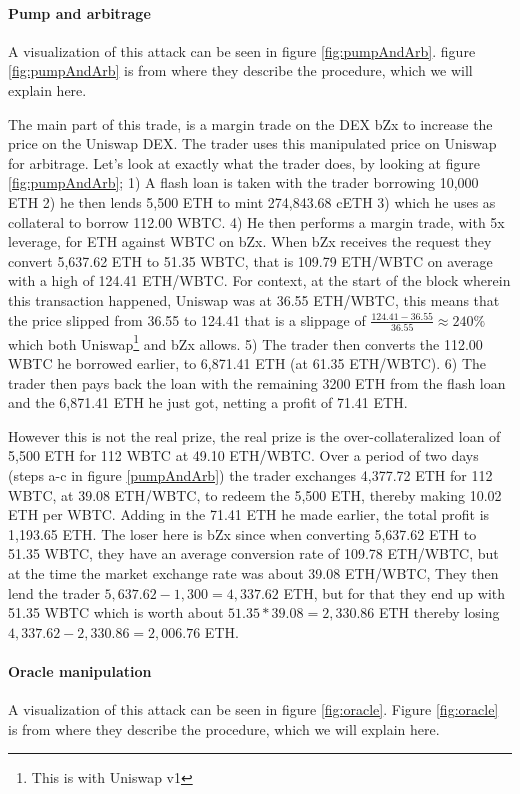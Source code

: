 \paragraph{Pump and arbitrage} A visualization of this attack can be
seen in figure \ref{fig:pumpAndArb}. figure \ref{fig:pumpAndArb} is
from \cite{attack} where they describe the procedure, which we will
explain here.

The main part of this trade, is a margin trade on the DEX bZx to
increase the price on the Uniswap DEX. The trader uses this
manipulated price on Uniswap for arbitrage. Let's look at exactly what
the trader does, by looking at figure \ref{fig:pumpAndArb}; 1) A flash
loan is taken with the trader borrowing 10,000 ETH 2) he then lends
5,500 ETH to mint 274,843.68 cETH 3) which he uses as collateral to
borrow 112.00 WBTC. 4) He then performs a margin trade, with 5x
leverage, for ETH against WBTC on bZx. When bZx receives the request
they convert 5,637.62 ETH to 51.35 WBTC, that is 109.79 ETH/WBTC on
average with a high of 124.41 ETH/WBTC. For context, at the start of
the block wherein this transaction happened, Uniswap was at 36.55 ETH/WBTC,
this means that the price slipped from 36.55 to 124.41 that is a
slippage of $\frac{124.41-36.55}{36.55}\approx 240\%$ which both
Uniswap\footnote{This is with Uniswap v1} and bZx allows. 5) The
trader then converts the 112.00 WBTC he borrowed earlier, to 6,871.41
ETH (at 61.35 ETH/WBTC). 6) The trader then pays back the loan with
the remaining 3200 ETH from the flash loan and the 6,871.41 ETH he
just got, netting a profit of 71.41 ETH.

However this is not the real prize, the real prize is the
over-collateralized loan of 5,500 ETH for 112 WBTC at 49.10 ETH/WBTC.
Over a period of two days (steps a-c in figure \ref{pumpAndArb}) the trader
exchanges 4,377.72 ETH for 112 WBTC, at 39.08 ETH/WBTC, to redeem the 5,500 ETH,
thereby making 10.02 ETH per WBTC. Adding in the 71.41 ETH he made earlier, the
total profit is 1,193.65 ETH. The loser here is bZx since when converting
5,637.62 ETH to 51.35 WBTC, they have an average conversion rate of 109.78
ETH/WBTC, but at the time the market exchange rate was about 39.08
ETH/WBTC, They then lend the trader $5,637.62-1,300=4,337.62$ ETH, but
for that they end up with 51.35 WBTC which is worth about
$51.35*39.08=2,330.86$ ETH thereby losing $4,337.62-2,330.86=2,006.76$
ETH.

\paragraph{Oracle manipulation} A visualization of this attack can be
seen in figure \ref{fig:oracle}. Figure \ref{fig:oracle} is from
\cite{attack} where they describe the procedure, which we will explain
here.

